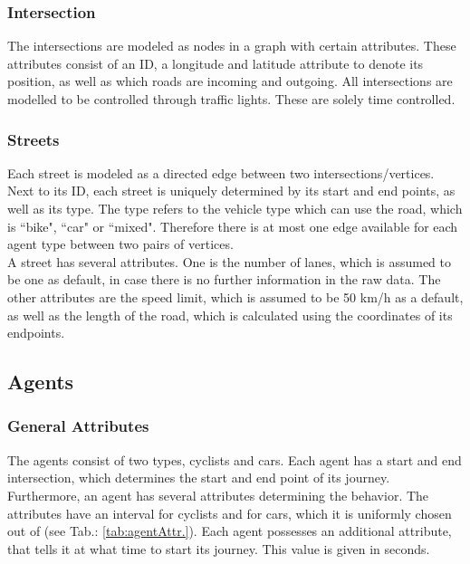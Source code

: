 \subsubsection{Intersection}
The intersections are modeled as nodes in a graph with certain attributes. These attributes consist of an ID, a longitude and latitude attribute to denote its position, as well as which roads are incoming and outgoing. All intersections are modelled to be controlled through traffic lights. These are solely time controlled.

\subsubsection{Streets}
Each street is modeled as a directed edge between two intersections/vertices. Next to its ID, each street is uniquely determined by its start and end points, as well as its type. The type refers to the vehicle type which can use the road, which is ``bike", ``car" or ``mixed". Therefore there is at most one edge available for each agent type between two pairs of vertices.\\
A street has several attributes. One is the number of lanes, which is assumed to be one as default, in case there is no further information in the raw data. The other attributes are the speed limit, which is assumed to be 50 km/h as a default, as well as the length of the road, which is calculated using the coordinates of its endpoints.

\subsection{Agents}\label{agentDesc}
\subsubsection{General Attributes}
The agents consist of two types, cyclists and cars. Each agent has a start and end intersection, which determines the start and end point of its journey. Furthermore, an agent has several attributes determining the behavior. The attributes have an interval for cyclists and for cars, which it is uniformly chosen out of (see Tab.: \ref{tab:agentAttr.}). Each agent possesses an additional attribute, that tells it at what time to start its journey. This value is given in seconds. 

